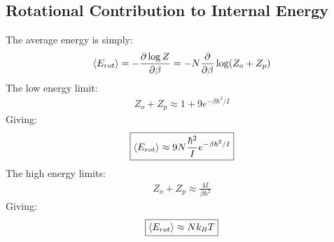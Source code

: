 \documentclass[12pt]{article}
\begin{document}
\subsection{Rotational Contribution to Internal Energy}
The average energy is simply:
\begin{align*}
  \ev{E_{rot}}=-\pdv{\log Z}{\beta}=-N\pdv{\beta}\log(Z_o+Z_p)
\end{align*}
The low energy limit:
\begin{align*}
  Z_o+Z_p\approx1+9e^{-\beta\hbar^2/I}
\end{align*}
Giving:
\begin{align}
  \boxed{\ev{E_{rot}}\approx9N\frac{\hbar^2}Ie^{-\beta\hbar^2/I}}
\end{align}
The high energy limits:
\begin{align*}
  Z_o+Z_p\approx\frac{4I}{\beta\hbar^2}
\end{align*}
Giving:
\begin{align}
  \boxed{\ev{E_{rot}}\approx Nk_BT}
\end{align}
\end{document}
